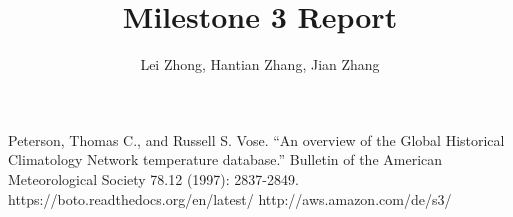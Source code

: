 \documentclass[a4paper]{article}
\begin{document}
\newtheorem{thm}{Theorem}
\newtheorem*{thm*}{Theorem}
\newtheorem{lem}{Lemma}
\newtheorem{cla}{Claim}
\newtheorem{prop}{Proposition}

\title{Milestone 3 Report}

\author{Lei Zhong, Hantian Zhang, Jian Zhang}
\date{}
\maketitle

\abstract{}





%
%
\begin{thebibliography}{1}
     Peterson, Thomas C., and Russell S. Vose. ``An overview of the Global Historical Climatology Network temperature database.'' Bulletin of the American Meteorological Society 78.12 (1997): 2837-2849.
     https://boto.readthedocs.org/en/latest/
     http://aws.amazon.com/de/s3/
\end{thebibliography}
\end{document}
